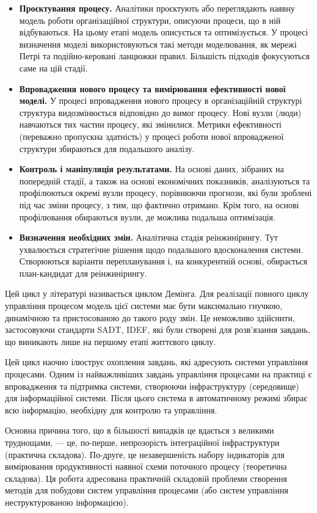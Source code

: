 \documentclass{memoir}
\begin{document}
\begin{itemize}
    \item \textbf{Проєктування процесу.} Аналітики проєктують або переглядають наявну модель роботи організаційної структури, описуючи процеси, що в ній відбуваються. На цьому етапі модель описується та оптимізується. У процесі визначення моделі використовуються такі методи моделювання, як мережі Петрі та подійно-керовані ланцюжки правил. Більшість підходів фокусуються саме на цій стадії.
    \item \textbf{Впровадження нового процесу та вимірювання ефективності нової моделі.} У процесі впровадження нового процесу в організаційній структурі структура видозмінюється відповідно до вимог процесу. Нові вузли (люди) навчаються тих частин процесу, які змінилися. Метрики ефективності (переважно пропускна здатність) у процесі роботи нової впровадженої структури збираються для подальшого аналізу.
    \item \textbf{Контроль і маніпуляція результатами.} На основі даних, зібраних на попередній стадії, а також на основі економічних показників, аналізуються та профілюються окремі вузли процесу, порівнюючи прогнози, які були зроблені під час зміни процесу, з тим, що фактично отримано. Крім того, на основі профілювання обираються вузли, де можлива подальша оптимізація.
    \item \textbf{Визначення необхідних змін.} Аналітична стадія реінжинірингу. Тут ухвалюється стратегічне рішення щодо подальшого вдосконалення системи. Створюються варіанти перепланування і, на конкурентній основі, обирається план-кандидат для реінжинірингу.
\end{itemize}

Цей цикл у літературі називається циклом Демінга. Для реалізації повного циклу управління процесом модель цієї системи має бути максимально гнучкою, динамічною та пристосованою до такого роду змін. Це неможливо здійснити, застосовуючи стандарти SADT, IDEF, які були створені для розв’язання завдань, що виникають лише на першому етапі життєвого циклу.

Цей цикл наочно ілюструє охоплення завдань, які адресують системи управління процесами. Одним із найважливіших завдань управління процесами на практиці є впровадження та підтримка системи, створюючи інфраструктуру (середовище) для інформаційної системи. Після цього система в автоматичному режимі збирає всю інформацію, необхідну для контролю та управління.

Основна причина того, що в більшості випадків це вдається з великими труднощами, — це, по-перше, непрозорість інтеграційної інфраструктури (практична складова). По-друге, це незавершеність набору індикаторів для вимірювання продуктивності наявної схеми поточного процесу (теоретична складова). Ця робота адресована практичній складовій проблеми створення методів для побудови систем управління процесами (або систем управління неструктурованою інформацією).
\end{document}
